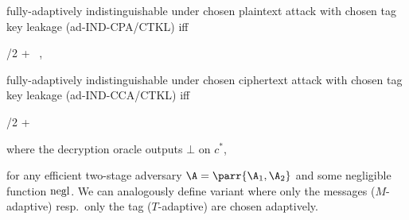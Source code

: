 \begin{definition}
\begin{sitemize}
        \item fully-adaptively indistinguishable under chosen plaintext attack with chosen tag key leakage (ad-IND-CPA/CTKL) iff
        \begin{bralign}
            /2 + \varepsilon\parr{\secpar}
            \ ,
        \end{bralign}

        \item fully-adaptively indistinguishable under chosen ciphertext attack with chosen tag key leakage (ad-IND-CCA/CTKL) iff
        \begin{bralign}
            /2 + \varepsilon\parr{\secpar}
        \end{bralign}
        where the decryption oracle outputs \(\bot\) on \(c^*\),
    \end{sitemize}
    for any efficient two-stage adversary \(\A = \parr{\A_1, \A_2}\) and some negligible function \(\operatorname{negl}\).
    We can analogously define variant where only the messages (\(M\)-adaptive) resp.\ only the tag (\(T\)-adaptive) are chosen adaptively.
\end{definition}

